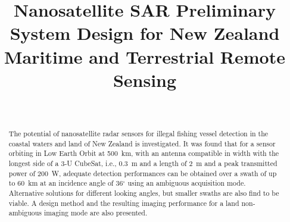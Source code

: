 \documentclass[conference,a4paper]{IEEEtran}
\begin{document}
%
    \title{Nanosatellite SAR Preliminary System Design for New Zealand Maritime and Terrestrial Remote Sensing}

    \author{                                     %
    \\
    }





    \maketitle

    \begin{abstract}
        The potential of nanosatellite radar sensors for illegal fishing vessel detection in the coastal waters and land of New Zealand is investigated.
        It was found that for a sensor orbiting in Low Earth Orbit at 500~km, with an antenna compatible in width with the longest side of a 3-U CubeSat, i.e., 0.3~m and a length of 2~m and a peak transmitted power of 200~W, adequate detection performances can be obtained over a swath of up to 60~km at an incidence angle of 36$^\circ$ using an ambiguous acquisition mode.
        Alternative solutions for different looking angles, but smaller swaths are also find to be viable.
        A design method and the resulting imaging performance for a land non-ambiguous imaging mode are also presented.
    \end{abstract}
\end{document}
